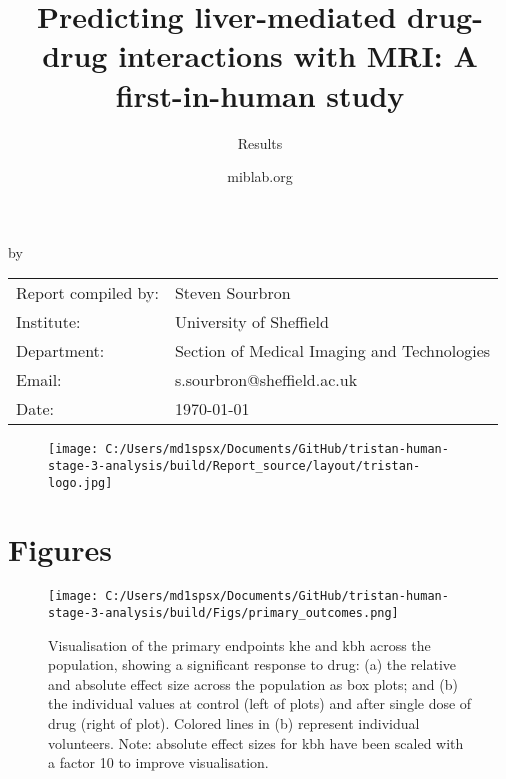 \documentclass{epflreport}%
\begin{document}
%
\normalsize%
\frontmatter%
\title{Predicting liver{-}mediated drug{-}drug interactions with MRI: A first{-}in{-}human study}%
\subtitle{Results}%
\author{miblab.org}%
\subject{Internal report}%
%
%
%
\makecover%
\begin{titlepage}%
\begin{center}%
\makeatletter%
\largetitlestyle\fontsize{45}{45}\selectfont\@title%
\makeatother%
\linebreak%
\makeatletter%
\ifdefvoid{\@subtitle}{}{\bigskip\titlestyle\fontsize{20}{20}\selectfont\@subtitle}%
\makeatother%
\linebreak%
\bigskip%
\bigskip%
by%
\linebreak%
\bigskip%
\bigskip%
\makeatletter%
\largetitlestyle\fontsize{25}{25}\selectfont\@author%
\makeatother%
\vfill%
\large%
\begin{tabular}{ll}%
\hline%
Report compiled by: &Steven Sourbron\\%
Institute: &University of Sheffield\\%
Department: &Section of Medical Imaging and Technologies\\%
Email: &s.sourbron@sheffield.ac.uk\\%
Date: &\today\\%
\hline%
\end{tabular}%


\begin{figure}[b!]%
\centering%
\centering%
\texttt{[image: C:/Users/md1spsx/Documents/GitHub/tristan-human-stage-3-analysis/build/Report\_source/layout/tristan-logo.jpg]}%
\end{figure}

%
\end{center}%
\end{titlepage}%
\newpage%
\tableofcontents%
\mainmatter%
\clearpage%
\chapter{Figures}%
\clearpage%


\begin{figure}[h!]%
\centering%
\texttt{[image: C:/Users/md1spsx/Documents/GitHub/tristan-human-stage-3-analysis/build/Figs/primary\_outcomes.png]}%
\caption{Visualisation of the primary endpoints khe and kbh across the population, showing a significant response to drug: (a) the relative and absolute effect size across the population as box plots; and (b) the individual values at control (left of plots) and after single dose of drug (right of plot). Colored lines in (b) represent individual volunteers. Note: absolute effect sizes for kbh have been scaled with a factor 10 to improve visualisation.}%
\end{figure}
\end{document}
